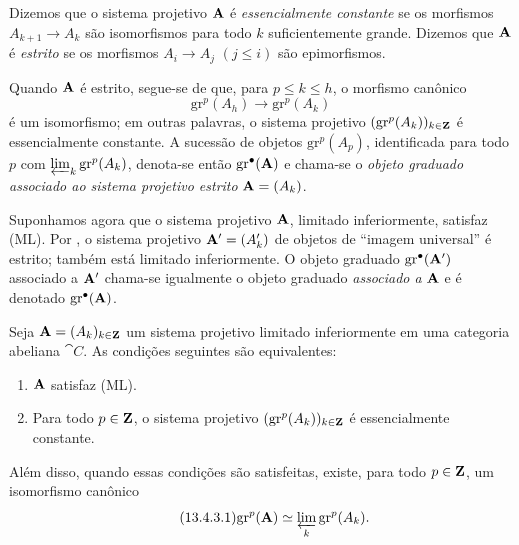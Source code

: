 \begin{env}[13.4.2]
\label{0.13.4.2}
Dizemos que o sistema projetivo $\mathbf{A}$ é
\emph{essencialmente constante} se os morfismos
$A_{k+1}\longrightarrow A_k$ são isomorfismos para todo $k$
suficientemente grande.
Dizemos que $\mathbf{A}$ é \emph{estrito} se os morfismos
$A_i\longrightarrow A_j$ $(j\leq i)$ são epimorfismos.

Quando $\mathbf{A}$ é estrito, segue-se de  que, para
$p\leq k\leq h$, o morfismo canônico
\[
  \mathrm{gr}^p(A_h)\longrightarrow\mathrm{gr}^p(A_k)
\]
é um isomorfismo; em outras palavras, o sistema projetivo
$(\mathrm{gr}^p(A_k))_{k\in\mathbf{Z}}$ é essencialmente constante.
A sucessão de objetos $\mathrm{gr}^p(A_p)$, identificada para todo
$p$ com $\varprojlim_k\mathrm{gr}^p(A_k)$, denota-se então
$\mathrm{gr}^\bullet(\mathbf{A})$ e chama-se o
\emph{objeto graduado associado ao sistema projetivo estrito}
$\mathbf{A}=(A_k)$.

Suponhamos agora que o sistema projetivo $\mathbf{A}$, limitado
inferiormente, satisfaz (ML).
Por , o sistema projetivo
$\mathbf{A}'=(A'_k)$ de objetos de ``imagem universal'' é estrito; também está
limitado inferiormente.
O objeto graduado $\mathrm{gr}^\bullet(\mathbf{A}')$ associado a
$\mathbf{A}'$ chama-se igualmente o objeto graduado
\emph{associado a} $\mathbf{A}$ e é denotado
$\mathrm{gr}^\bullet(\mathbf{A})$.
\end{env}

\begin{proposition}[13.4.3]
\label{0.13.4.3}
Seja $\mathbf{A}=(A_k)_{k\in\mathbf{Z}}$ um sistema projetivo limitado
inferiormente em uma categoria abeliana $\cat{C}$.
As condições seguintes são equivalentes:
\begin{enumerate}
  \item[{\rm a)}] $\mathbf{A}$ satisfaz (ML).
  \item[{\rm b)}] Para todo $p\in\mathbf{Z}$, o sistema projetivo
  $(\mathrm{gr}^p(A_k))_{k\in\mathbf{Z}}$ é essencialmente constante.
\end{enumerate}
Além disso, quando essas condições são satisfeitas, existe, para todo
$p\in\mathbf{Z}$, um isomorfismo canônico
\begin{equation}
\label{0.13.4.3.1}
\tag{13.4.3.1}
  \mathrm{gr}^p(\bb{A})
  \isoto
  \varprojlim_k\mathrm{gr}^p(A_k).
\end{equation}
\end{proposition}

